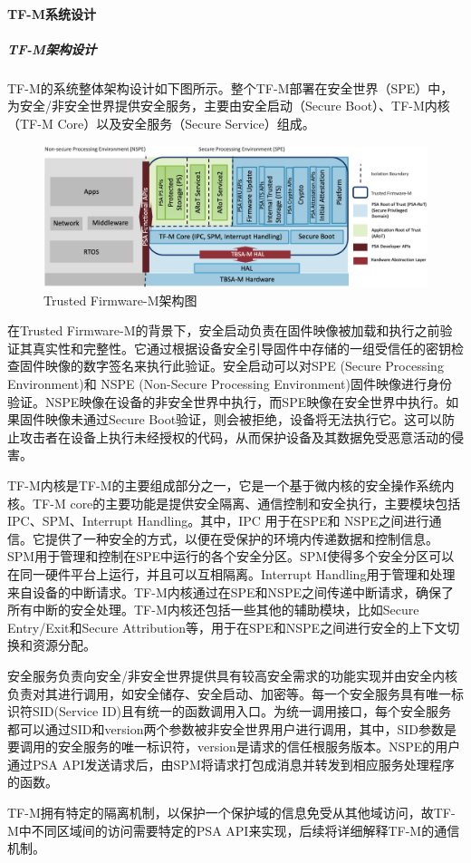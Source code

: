 \documentclass[12pt,a4paper]{ctexart}
\begin{document}
\paragraph{TF-M系统设计}
\subparagraph{TF-M架构设计}
\par TF-M的系统整体架构设计如下图所示。整个TF-M部署在安全世界（SPE）中，为安全/非安全世界提供安全服务，主要由安全启动（Secure Boot）、TF-M内核（TF-M Core）以及安全服务（Secure Service）组成。
\begin{figure}
    \centering
    \includegraphics[scale=0.2]{graph/readme_tfm_v8.png}
    \caption{Trusted Firmware-M架构图}
\end{figure}
\par 在Trusted Firmware-M的背景下，安全启动负责在固件映像被加载和执行之前验证其真实性和完整性。它通过根据设备安全引导固件中存储的一组受信任的密钥检查固件映像的数字签名来执行此验证。安全启动可以对SPE (Secure Processing Environment)和 NSPE (Non-Secure Processing Environment)固件映像进行身份验证。NSPE映像在设备的非安全世界中执行，而SPE映像在安全世界中执行。如果固件映像未通过Secure Boot验证，则会被拒绝，设备将无法执行它。这可以防止攻击者在设备上执行未经授权的代码，从而保护设备及其数据免受恶意活动的侵害。
\par TF-M内核是TF-M的主要组成部分之一，它是一个基于微内核的安全操作系统内核。TF-M core的主要功能是提供安全隔离、通信控制和安全执行，主要模块包括IPC、SPM、Interrupt Handling。其中，IPC 用于在SPE和 NSPE之间进行通信。它提供了一种安全的方式，以便在受保护的环境内传递数据和控制信息。SPM用于管理和控制在SPE中运行的各个安全分区。SPM使得多个安全分区可以在同一硬件平台上运行，并且可以互相隔离。Interrupt Handling用于管理和处理来自设备的中断请求。TF-M内核通过在SPE和NSPE之间传递中断请求，确保了所有中断的安全处理。TF-M内核还包括一些其他的辅助模块，比如Secure Entry/Exit和Secure Attribution等，用于在SPE和NSPE之间进行安全的上下文切换和资源分配。
\par 安全服务负责向安全/非安全世界提供具有较高安全需求的功能实现并由安全内核负责对其进行调用，如安全储存、安全启动、加密等。每一个安全服务具有唯一标识符SID(Service ID)且有统一的函数调用入口。为统一调用接口，每个安全服务都可以通过SID和version两个参数被非安全世界用户进行调用，其中，SID参数是要调用的安全服务的唯一标识符，version是请求的信任根服务版本。NSPE的用户通过PSA API发送请求后，由SPM将请求打包成消息并转发到相应服务处理程序的函数。
\par TF-M拥有特定的隔离机制，以保护一个保护域的信息免受从其他域访问，故TF-M中不同区域间的访问需要特定的PSA API来实现，后续将详细解释TF-M的通信机制。
\end{document}
